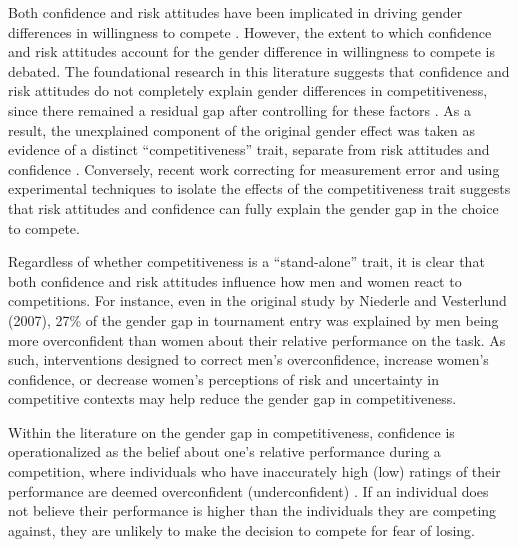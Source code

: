 \documentclass[a4paper, nobind]{templates/ociamthesis}
\begin{document}
Both confidence and risk attitudes have been implicated in driving gender differences in willingness to compete \autocite{Niederle2011,Veldhuizen2017}. However, the extent to which confidence and risk attitudes account for the gender difference in willingness to compete is debated. The foundational research in this literature suggests that confidence and risk attitudes do not completely explain gender differences in competitiveness, since there remained a residual gap after controlling for these factors \autocite{Niederle2007}. As a result, the unexplained component of the original gender effect was taken as evidence of a distinct ``competitiveness'' trait, separate from risk attitudes and confidence \autocite{Niederle2007,Niederle2011}. Conversely, recent work correcting for measurement error \autocite{Gillen2019} and using experimental techniques to isolate the effects of the competitiveness trait \autocite{Veldhuizen2017} suggests that risk attitudes and confidence can fully explain the gender gap in the choice to compete.

Regardless of whether competitiveness is a ``stand-alone'' trait, it is clear that both confidence and risk attitudes influence how men and women react to competitions. For instance, even in the original study by Niederle and Vesterlund (2007), 27\% of the gender gap in tournament entry was explained by men being more overconfident than women about their relative performance on the task. As such, interventions designed to correct men's overconfidence, increase women's confidence, or decrease women's perceptions of risk and uncertainty in competitive contexts may help reduce the gender gap in competitiveness.

Within the literature on the gender gap in competitiveness, confidence is operationalized as the belief about one's relative performance during a competition, where individuals who have inaccurately high (low) ratings of their performance are deemed overconfident (underconfident) \autocites{Niederle2011}[also see overplacement in][]{Moore2008}. If an individual does not believe their performance is higher than the individuals they are competing against, they are unlikely to make the decision to compete for fear of losing.
\end{document}
